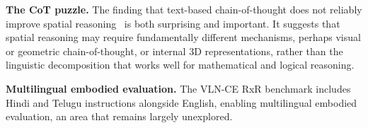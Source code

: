\textbf{The CoT puzzle.} The finding that text-based chain-of-thought does not reliably improve spatial reasoning~\cite{cai2025scalingspatialintelligencemultimodal} is both surprising and important. It suggests that spatial reasoning may require fundamentally different mechanisms, perhaps visual or geometric chain-of-thought, or internal 3D representations, rather than the linguistic decomposition that works well for mathematical and logical reasoning.

\textbf{Multilingual embodied evaluation.} The VLN-CE RxR benchmark includes Hindi and Telugu instructions alongside English, enabling multilingual embodied evaluation, an area that remains largely unexplored.
